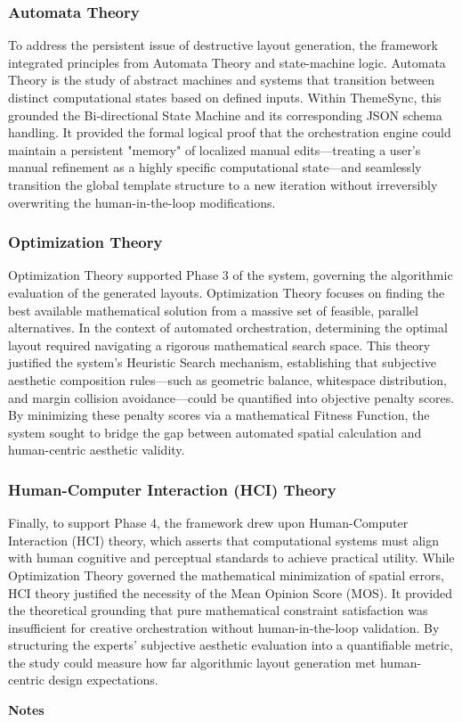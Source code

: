 \begin{refsection}
\subsubsection{Automata Theory}
To address the persistent issue of destructive layout generation, the framework integrated principles from Automata Theory and state-machine logic. Automata Theory is the study of abstract machines and systems that transition between distinct computational states based on defined inputs. Within ThemeSync, this grounded the Bi-directional State Machine and its corresponding JSON schema handling. It provided the formal logical proof that the orchestration engine could maintain a persistent "memory" of localized manual edits—treating a user’s manual refinement as a highly specific computational state—and seamlessly transition the global template structure to a new iteration without irreversibly overwriting the human-in-the-loop modifications.

\subsubsection{Optimization Theory}
Optimization Theory supported Phase 3 of the system, governing the algorithmic evaluation of the generated layouts. Optimization Theory focuses on finding the best available mathematical solution from a massive set of feasible, parallel alternatives. In the context of automated orchestration, determining the optimal layout required navigating a rigorous mathematical search space. This theory justified the system's Heuristic Search mechanism, establishing that subjective aesthetic composition rules—such as geometric balance, whitespace distribution, and margin collision avoidance—could be quantified into objective penalty scores. By minimizing these penalty scores via a mathematical Fitness Function, the system sought to bridge the gap between automated spatial calculation and human-centric aesthetic validity.

\subsubsection{Human-Computer Interaction (HCI) Theory}
Finally, to support Phase 4, the framework drew upon Human-Computer Interaction (HCI) theory, which asserts that computational systems must align with human cognitive and perceptual standards to achieve practical utility. While Optimization Theory governed the mathematical minimization of spatial errors, HCI theory justified the necessity of the Mean Opinion Score (MOS). It provided the theoretical grounding that pure mathematical constraint satisfaction was insufficient for creative orchestration without human-in-the-loop validation. By structuring the experts' subjective aesthetic evaluation into a quantifiable metric, the study could measure how far algorithmic layout generation met human-centric design expectations.



\clearpage

\begin{center}
\textbf{Notes}
\end{center}
\printbibliography[heading=none]
\end{refsection}